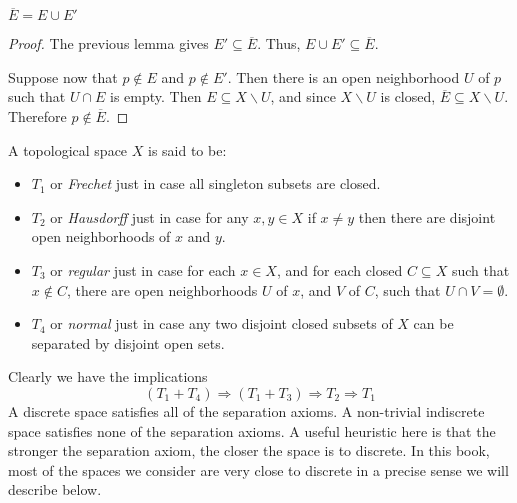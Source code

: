 \begin{prop} $\overline{E}=E\cup E'$ \end{prop}

\begin{proof} The previous lemma gives $E'\subseteq \overline{E}$.
  Thus, $E\cup E'\subseteq \overline{E}$.  

  Suppose now that $p\not\in E$ and $p\not\in E'$.  Then there is an
  open neighborhood $U$ of $p$ such that $U\cap E$ is empty.  Then
  $E\subseteq X\backslash U$, and since $X\backslash U$ is closed,
  $\overline{E}\subseteq X\backslash U$.  Therefore $p\not\in
  \overline{E}$.




\end{proof}

\begin{defn} A topological space $X$ is said to be:
\begin{itemize}
\item $T_1$ or \emph{Frechet} just in case all singleton
  subsets are closed.
\item $T_2$ or \emph{Hausdorff} just in case for any $x,y\in X$
  if $x\neq y$ then there are disjoint open neighborhoods of $x$ and
  $y$.
\item $T_3$ or \emph{regular} just in case for each $x\in X$, and for
  each closed $C\subseteq X$ such that $x\not\in C$, there are open
  neighborhoods $U$ of $x$, and $V$ of $C$, such that $U\cap
  V=\emptyset$.
\item $T_4$ or \emph{normal} just in case any two disjoint closed
  subsets of $X$ can be separated by disjoint open
  sets.  \end{itemize} \end{defn}

Clearly we have the implications 
\[ (T_1+T_4)\Rightarrow (T_1+T_3)\Rightarrow T_2 \Rightarrow T_1\] A
discrete space satisfies all of the separation axioms.  A non-trivial
indiscrete space satisfies none of the separation axioms.  A useful
heuristic here is that the stronger the separation axiom, the closer
the space is to discrete.  In this book, most of the spaces we
consider are very close to discrete in a precise sense we will
describe below.


